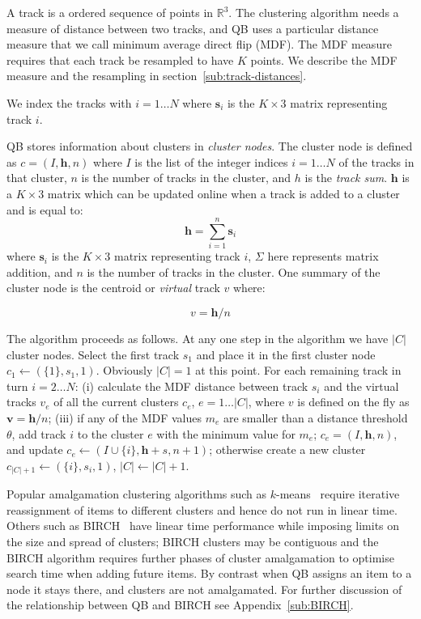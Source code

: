 \documentclass[journal]{IEEEtran}
\begin{document}
A track is a ordered sequence of points in $\mathbb{R}^{3}$.  The
clustering algorithm needs a measure of distance between two tracks, and
QB uses a particular distance measure that we call minimum average
direct flip (MDF).  The MDF measure requires that each track be
resampled to have $K$ points. We describe the MDF measure and the
resampling in section~\ref{sub:track-distances}.

We index the tracks with $i = 1 \dots N$ where $\mathbf{s}_{i}$ is the
$K\times3$ matrix representing track $i$.

QB stores information about clusters in \emph{cluster nodes}.  The
cluster node is defined as $c=(I,\mathbf{h},n)$ where $I$ is the list of
the integer indices $i = 1 \dots N$ of the tracks in that cluster, $n$
is the number of tracks in the cluster, and $h$ is the \emph{track
  sum}. $\mathbf{h}$ is a $K \times3$ matrix which can be updated online
when a track is added to a cluster and is equal to:
\begin{equation}
  \mathbf{h}=\sum_{i=1}^{n}\mathbf{s}_{i}
\end{equation} 
where $\mathbf{s}_{i}$ is the $K\times3$ matrix representing track $i$,
$\Sigma$ here represents matrix addition, and $n$ is the number of
tracks in the cluster. One summary of the cluster node is the centroid or
\emph{virtual} track $v$ where:

\begin{equation}
  v = \mathbf{h} / n
\end{equation}

The algorithm proceeds as follows.  At any one step in the algorithm we
have $|C|$ cluster nodes. Select the first track $s_{1}$ and place it in
the first cluster node $c_{1}\leftarrow(\{1\},s_{1},1)$.  Obviously $|C|
= 1$ at this point.  For each remaining track in turn $i = 2 \dots N$:
(i) calculate the MDF distance between track $s_{i}$ and the virtual
tracks $v_{e}$ of all the current clusters $c_{e}$, $e = 1 \dots |C|$,
where $v$ is defined on the fly as $\mathbf{v}=\mathbf{h}/n$; (iii) if
any of the MDF values $m_{e}$ are smaller than a distance threshold
$\theta$, add track $i$ to the cluster $e$ with the minimum value for
$m_{e}$; $c_{e}=(I,\mathbf{h},n)$, and update
$c_{e}\leftarrow(I\cup\{i\},\mathbf{h}+s,n+1)$; otherwise create a new
cluster $c_{|C|+1}\leftarrow(\{i\},s_{i},1)$, $|C|\leftarrow|C|+1$.

Popular amalgamation clustering algorithms such as
$k$-means~\cite{steinhaus1956division, macqueen1967some} require
iterative reassignment of items to different clusters and hence do not
run in linear time. Others such as BIRCH~\cite{zhang1997birch} have
linear time performance while imposing limits on the size and spread of
clusters; BIRCH clusters may be contiguous and the BIRCH algorithm
requires further phases of cluster amalgamation to optimise search time
when adding future items. By contrast when QB assigns an item to a node
it stays there, and clusters are not amalgamated.  For further
discussion of the relationship between QB and BIRCH see
Appendix~\ref{sub:BIRCH}.
\end{document}
